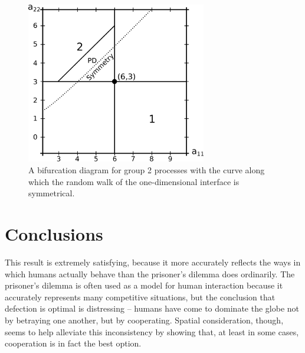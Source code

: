 \documentclass[notitlepage,reqno]{amsart}
\begin{document}
\begin{figure}[h]
\includegraphics[width=0.7\textwidth]{./images/1d_pd_plot.eps}
\caption{A bifurcation diagram for group 2 processes with the curve
  along which the random walk of the one-dimensional interface is
  symmetrical.}
\label{fig:pddiagram}
\end{figure}

\section{Conclusions}

This result is extremely satisfying, because it more accurately
reflects the ways in which humans actually behave than the prisoner's
dilemma does ordinarily. The prisoner's dilemma is often used as a
model for human interaction because it accurately represents many
competitive situations, but the conclusion that defection is optimal
is distressing -- humans have come to dominate the globe not by
betraying one another, but by cooperating. Spatial consideration,
though, seems to help alleviate this inconsistency by showing that, at
least in some cases, cooperation is in fact the best option.




\newpage

{}

\end{document}
